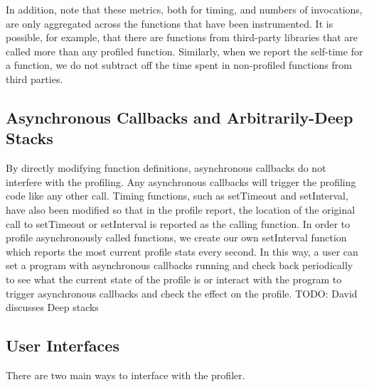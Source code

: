 \documentclass[11pt]{article}
\begin{document}
In addition, note that these metrics, both for timing, and
numbers of invocations, are only aggregated across the functions that
have been instrumented. It is possible, for example, that there are
functions from third-party libraries that are called more than any
profiled function. Similarly, when we report the self-time for a
function, we do not subtract off the time spent in non-profiled
functions from third parties. 


\subsection{Asynchronous Callbacks and Arbitrarily-Deep Stacks}
	By directly modifying function definitions, asynchronous callbacks do not interfere with 
the profiling. Any asynchronous callbacks will trigger the profiling code like any other call. 
Timing functions, such as setTimeout and setInterval, have also been modified so 
that in the profile report, the location of the original call to setTimeout or setInterval 
is reported as the calling function. In order to profile asynchronously called functions, we create
our own setInterval function which reports the most current profile stats every second. In this 
way, a user can set a program with asynchronous callbacks running and check back periodically 
to see what the current state of the profile is or interact with the program to trigger asynchronous 
callbacks and check the effect on the profile. 
TODO: David discusses Deep stacks

\subsection{User Interfaces}
There are two main ways to interface with the profiler. 
\end{document}
